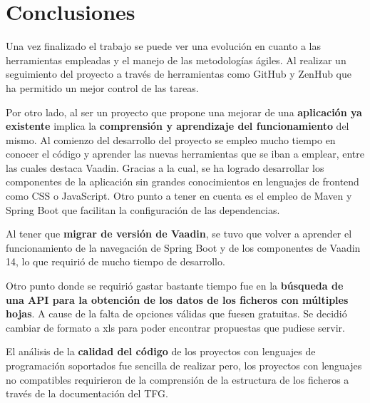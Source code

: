 
\section{Conclusiones}
Una vez finalizado el trabajo se puede ver una evolución en cuanto a las herramientas empleadas y el manejo de las metodologías ágiles. Al realizar un seguimiento del proyecto a través de herramientas como GitHub y ZenHub que ha permitido un mejor control de las tareas.

Por otro lado, al ser un proyecto que propone una mejorar de una \textbf{aplicación ya existente} implica la \textbf{comprensión y aprendizaje del funcionamiento} del mismo. Al comienzo del desarrollo del proyecto se empleo mucho tiempo en conocer el código y aprender las nuevas herramientas que se iban a emplear, entre las cuales destaca Vaadin. Gracias a la cual, se ha logrado desarrollar los componentes de la aplicación sin grandes conocimientos en lenguajes de frontend como CSS o JavaScript. 
Otro punto a tener en cuenta es el empleo de Maven y Spring Boot que facilitan la configuración de las dependencias.

Al tener que \textbf{migrar de versión de Vaadin}, se tuvo que volver a aprender el funcionamiento de la navegación de Spring Boot y de los componentes de Vaadin 14, lo que requirió de mucho tiempo de desarrollo.

Otro punto donde se requirió gastar bastante tiempo fue en la \textbf{búsqueda de una API para la obtención de los datos de los ficheros con múltiples hojas}. A cause de la falta de opciones válidas que fuesen gratuitas. Se decidió cambiar de formato a xls para poder encontrar propuestas que pudiese servir.

El análisis de la \textbf{calidad del código} de los proyectos con lenguajes de programación soportados fue sencilla de realizar pero, los proyectos con lenguajes no compatibles requirieron de la comprensión de la estructura de los ficheros a través de la documentación del TFG. 

